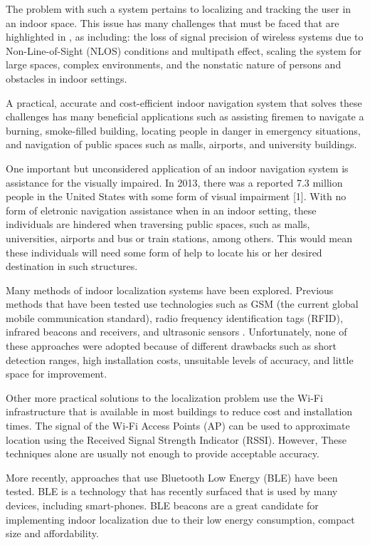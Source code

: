 \documentclass[conference]{IEEEtran}
\begin{document}
The problem with such a system pertains to localizing and tracking the user in an indoor space. This issue has many challenges that must be faced that are highlighted in \cite{mainetti2014survey}, as including: the loss of signal precision of wireless systems due to Non-Line-of-Sight (NLOS) conditions and multipath effect, scaling the system for large spaces, complex environments, and the nonstatic nature of persons and obstacles in indoor settings.

A practical, accurate and cost-efficient indoor navigation system that solves these challenges has many beneficial applications such as assisting firemen to navigate a burning, smoke-filled building, locating people in danger in emergency situations, and navigation of public spaces such as malls, airports, and university buildings.

One important but unconsidered application of an indoor navigation system is assistance for the visually impaired. In 2013, there was a reported 7.3 million people in the United States with some form of visual impairment [1]. With no form of eletronic navigation assistance when in an indoor setting, these individuals are hindered when traversing public spaces, such as malls, universities, airports and bus or train stations, among others. This would mean these individuals will need some form of help to locate his or her desired destination in such structures.

Many methods of indoor localization systems have been explored. Previous methods that have been tested use technologies such as GSM (the current global mobile communication standard), radio frequency identification tags (RFID), infrared beacons and receivers, and ultrasonic sensors \cite{otsason2005accurate,li2011performance,liu2014survey,ward1997new,medina2013ultrasound}. Unfortunately, none of these approaches were adopted because of different drawbacks such as short detection ranges, high installation costs, unsuitable levels of accuracy, and little space for improvement.

Other more practical solutions to the localization problem use the Wi-Fi infrastructure that is available in most buildings to reduce cost and installation times. The signal of the Wi-Fi Access Points (AP) can be used to approximate location using the Received Signal Strength Indicator (RSSI). However, These techniques alone are usually not enough to provide acceptable accuracy.

More recently, approaches that use Bluetooth Low Energy (BLE) have been tested. BLE is a technology that has recently surfaced that is used by many devices, including smart-phones. BLE beacons are a great candidate for implementing indoor localization due to their low energy consumption, compact size and affordability.
\end{document}

